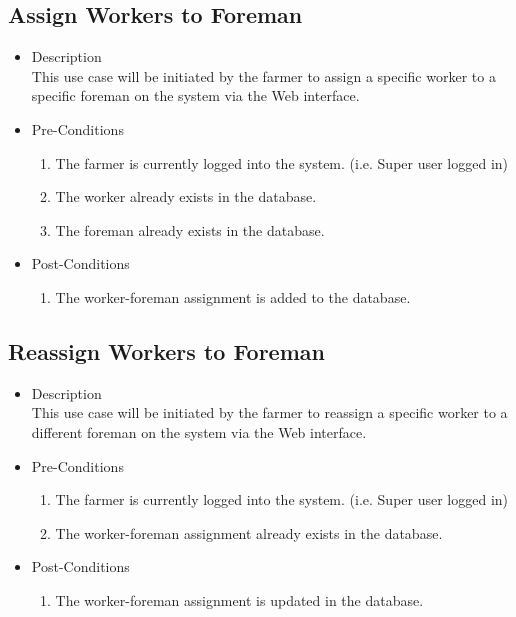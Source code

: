 \documentclass[11pt,fleqn]{book} %
\begin{document}
		\subsection{Assign Workers to Foreman}
		\begin{itemize}
			\item Description\\
			This use case will be initiated by the farmer to assign a specific worker to a specific foreman on the system via the Web interface.
			\item Pre-Conditions
			\begin{enumerate}
				\item The farmer is currently logged into the system. (i.e. Super user logged in)
				\item The worker already exists in the database. 
				\item The foreman already exists in the database. 					
			\end{enumerate}
			\item Post-Conditions
			\begin{enumerate}
				\item The worker-foreman assignment is added to the database.
			\end{enumerate}
		\end{itemize}
		
		\subsection{Reassign Workers to Foreman}
		\begin{itemize}
			\item Description\\
			This use case will be initiated by the farmer to reassign a specific worker to a different foreman on the system via the Web interface.
			\item Pre-Conditions
			\begin{enumerate}
				\item The farmer is currently logged into the system. (i.e. Super user logged in)
				\item The worker-foreman assignment already exists in the database.				
			\end{enumerate}
			\item Post-Conditions
			\begin{enumerate}
				\item The worker-foreman assignment is updated in the database.
			\end{enumerate}
		\end{itemize}
		
\end{document}

